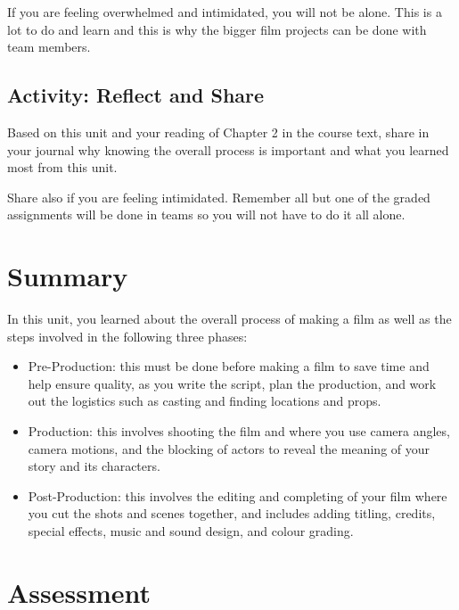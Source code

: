 \documentclass[
]{book}
\providecommand{\tightlist}{%
  \setlength{\itemsep}{0pt}\setlength{\parskip}{0pt}}
\begin{document}
If you are feeling overwhelmed and intimidated, you will not be alone. This is a lot to do and learn and this is why the bigger film projects can be done with team members.

\hypertarget{activity-reflect-and-share}{%
\subsection*{Activity: Reflect and Share}\label{activity-reflect-and-share}}

\begin{reflect}
Based on this unit and your reading of Chapter 2 in the course text, share in your journal why knowing the overall process is important and what you learned most from this unit.

Share also if you are feeling intimidated. Remember all but one of the graded assignments will be done in teams so you will not have to do it all alone.
\end{reflect}

\hypertarget{summary-1}{%
\section*{Summary}\label{summary-1}}

In this unit, you learned about the overall process of making a film as well as the steps involved in the following three phases:

\begin{itemize}
\tightlist
\item
  Pre-Production: this must be done before making a film to save time and help ensure quality, as you write the script, plan the production, and work out the logistics such as casting and finding locations and props.
\item
  Production: this involves shooting the film and where you use camera angles, camera motions, and the blocking of actors to reveal the meaning of your story and its characters.
\item
  Post-Production: this involves the editing and completing of your film where you cut the shots and scenes together, and includes adding titling, credits, special effects, music and sound design, and colour grading.
\end{itemize}

\hypertarget{assessment-3}{%
\section*{Assessment}\label{assessment-3}}
\end{document}
